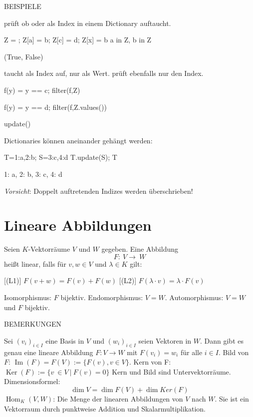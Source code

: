 \documentclass[fontsize=12pt,paper=a4,twoside,bibtotoc,idxtotoc,
liststotoc,pagesize,BCOR1.2cm,DIV15,chapterprefix,pagesize=pdftex]{scrbook}
\theoremstyle{plain}
\theoremstyle{definition}
\theoremstyle{remark}
\begin{document}
BEISPIELE


   prüft ob  oder  als Index in einem Dictionary auftaucht.
\begin{sagein}
Z = {}; Z[a] = b; Z[c] = d; Z[x] = b
a in Z, b in Z
\end{sagein}
\begin{sage}
(True, False)
\end{sage}
 taucht als Index auf,  nur als Wert.
  prüft ebenfalls nur den Index.
\begin{sagein}
f(y) = y == c; filter(f,Z)
\end{sagein}
\begin{sage}
[c]
\end{sage}

\begin{sagein}
f(y) = y == d; filter(f,Z.values())
\end{sagein}
\begin{sage}
[d]
\end{sage}



update()


 Dictionaries können aneinander gehängt werden:
\begin{sagein}
T={1:a,2:b}; S={3:c,4:d}
T.update(S); T
\end{sagein}
\begin{sage}
{1: a, 2: b, 3: c, 4: d}
\end{sage}
\emph{Vorsicht}: Doppelt auftretenden Indizes werden überschrieben!


\section{Lineare Abbildungen}
Seien $K$-Vektorräume $V$ und $W$ gegeben. Eine Abbildung
\[ F: \ V \rightarrow \ W \]
heißt {\color{red} linear}, falls für $v,w\in V$ und $\lambda \in K$ gilt:

 [(L1)] $F(v+w)=F(v)+F(w)$
 [(L2)] $F(\lambda \cdot v)=\lambda \cdot F(v)$
 

  {\color{red} Isomorphismus}: $F$ bijektiv. 
 {\color{red} Endomorphismus}: $V=W$.
 {\color{red} Automorphismus}: $V=W$ und $F$ bijektiv.


BEMERKUNGEN


 Sei $(v_i)_{i\in I}$ eine Basis in $V$ und $(w_i)_{i\in I}$
seien Vektoren in $W$. Dann gibt es genau eine lineare Abbildung $F:V
\rightarrow W$ mit $F(v_i)=w_i$ für alle $i \in I$.
 {\color{red} Bild} von $F$:   $\mathop{Im}(F) = F(V):=\{ F(v), v \in V \}$.
 {\color{red} Kern} von F: $\mathop{Ker}(F):=\{v \ \in V \ | \ F(v)=0 \}$
 Kern und Bild sind Untervektorräume.
 Dimensionsformel:
\[\dim V = \dim F(V) + \dim Ker(F)\]
 {\color{red} $\operatorname{Hom}_K(V,W)$}: Die Menge der linearen Abbildungen von $V$ nach $W$. 
Sie ist ein Vektorraum durch punktweise Addition und Skalarmultiplikation.
\end{document}
